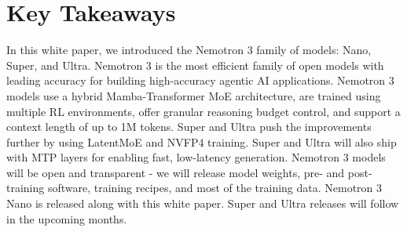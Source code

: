 \section{Key Takeaways}
\label{sec:contributions}
In this white paper, we introduced the Nemotron 3 family of models: Nano, Super, and Ultra. Nemotron 3 is the most efficient family of open models with leading accuracy for building high-accuracy agentic AI applications. Nemotron 3 models use a hybrid Mamba-Transformer MoE architecture, are trained using multiple RL environments, offer granular reasoning budget control, and support a context length of up to 1M tokens. Super and Ultra push the improvements further by using LatentMoE and NVFP4 training. Super and Ultra will also ship with MTP layers for enabling fast, low-latency generation. Nemotron 3 models will be open and transparent - we will release model weights, pre- and post-training software, training recipes, and most of the training data. Nemotron 3 Nano is released along with this white paper. Super and Ultra releases will follow in the upcoming months.